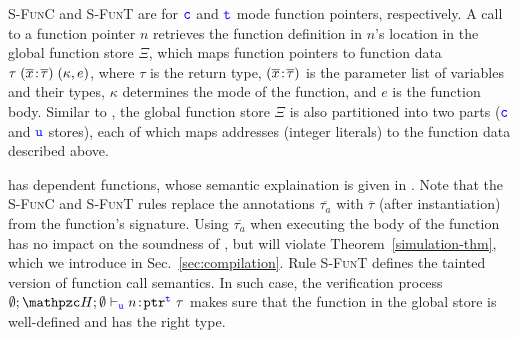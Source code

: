 {\textsc{S-FunC} and \textsc{S-FunT} are
for $\textcolor{blue}{\texttt{c}}$ and $\textcolor{blue}{\texttt{t}}$ mode function pointers, respectively. 
A call to a function pointer $n$ retrieves
 the function definition in $n$'s location in the global function store $\Xi$,
which maps function pointers to
function data $\tau\;({\overline{x}}\!:\!{\overline{\tau}})\;(\kappa,e)$, where
$\tau$ is the return type, $({\overline{x}}\!:\!{\overline{\tau}})$
is the parameter list of variables and their types, 
$\kappa$ determines the mode of the function, and $e$ is the
function body. 
Similar to \heap, the global function store $\Xi$ is also partitioned into
two parts ($\textcolor{blue}{\texttt{c}}$ and $\textcolor{blue}{\texttt{u}}$ stores), each of which
maps addresses (integer literals) to the function data described above.

\systemname{} has dependent functions, whose semantic explaination is given in .
Note that the \textsc{S-FunC} and \textsc{S-FunT} rules replace the
  annotations $\overline{\tau_a}$ with
  $\overline{\tau}$ (after instantiation) from the function's
  signature. Using $\overline{\tau_a}$ when executing the body of
the function has no impact on the soundness of \lang, but will violate
Theorem~\ref{simulation-thm}, which we introduce in Sec.~\ref{sec:compilation}.
Rule \textsc{S-FunT} defines the tainted version of function call semantics.
In such case, the verification process 
$\emptyset;\heap ; \emptyset \vdash_{\umode}\evalue{n}{\tptr{\tau}{\tmode}}$
makes sure that the function in the global store is well-defined and has the right type.




}
